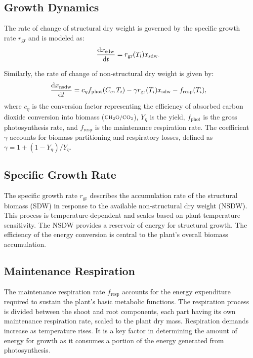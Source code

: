 \documentclass[conference]{IEEEtran}
\newcommand{\ui}[2]{#1_{\mathrm{#2}}}
\newcommand{\coo}{\ensuremath{\mathrm{CO_2}}}
\newcommand{\chho}{\ensuremath{\mathrm{CH_2O}}}
\begin{document}
\subsection{Growth Dynamics} The rate of change of structural dry weight is governed by the specific growth rate \( \ui{r}{gr} \) and is modeled as:
\begin{equation}
    \diff{\ui{x}{sdw}}{t} = \ui{r}{gr}(T_i) \ui{x}{sdw}.
\end{equation}

Similarly, the rate of change of non-structural dry weight is given by:
\begin{equation}
    \diff{\ui{x}{nsdw}}{t} = c_{\eta} \ui{f}{phot}(C_c, T_i) - \gamma \ui{r}{gr}(T_i) \ui{x}{sdw} - \ui{f}{resp}(T_i),
\end{equation}
where \( c_{\eta} \) is the conversion factor representing the efficiency of absorbed carbon dioxide conversion into biomass (\(\mathsmaller{\chho/\coo}\)), \( Y_{\eta} \) is the yield, \( \ui{f}{phot} \) is the gross photosynthesis rate, and \( \ui{f}{resp} \) is the maintenance respiration rate. The coefficient \( \gamma \) accounts for biomass partitioning and respiratory losses, defined as \( \gamma = 1 + (1 - Y_{\eta}) / Y_{\eta} \).

\subsection{Specific Growth Rate} The specific growth rate \( \ui{r}{gr} \) describes the accumulation rate of the structural biomass (SDW) in response to the available non-structural dry weight (NSDW). This process is temperature-dependent and scales based on plant temperature sensitivity. The NSDW provides a reservoir of energy for structural growth. The efficiency of the energy conversion is central to the plant's overall biomass accumulation.

\subsection{Maintenance Respiration} The maintenance respiration rate \( \ui{f}{resp} \) accounts for the energy expenditure required to sustain the plant's basic metabolic functions. The respiration process is divided between the shoot and root components, each part having its own maintenance respiration rate, scaled to the plant dry mass. Respiration demands increase as temperature rises. It is a key factor in determining the amount of energy for growth as it consumes a portion of the energy generated from photosynthesis.
\end{document}
